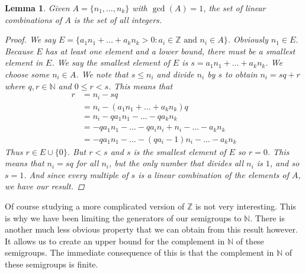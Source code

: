 \documentclass[11pt]{amsart}
\theoremstyle{plain}
\newtheorem{lemma}{Lemma}
\theoremstyle{definition}
\begin{document}
\begin{lemma}
  Given $A=\{n_1,\dots,n_k\}$ with $\gcd(A)=1$, the set of linear
  combinations of $A$ is the set of all integers.
  \begin{proof}
    We say $E=\{a_1n_1+\dots+a_kn_k>0:a_i\in \mathbb{Z}\text{ and }n_i\in A\}$.
    Obviously $n_1\in E$. Because $E$ has at least one element and a lower
    bound, there must be a smallest element in $E$. We say the smallest element
    of $E$ is $s=a_1n_1+\dots+a_kn_k$. We choose some $n_i\in A$. We note that
    $s\le n_i$ and divide $n_i$ by $s$ to obtain $n_i=sq+r$ where
    $q,r\in \mathbb{N}$ and $0\le r<s$. This means that
    \begin{align*}
      r&=n_i-sq\\
      &=n_i-(a_1n_1+\dots+a_kn_k)q\\
      &=n_i-qa_1n_1-\dots-qa_kn_k\\
      &=-qa_1n_1-\dots-qa_in_i+n_i-\dots-a_kn_k\\
      &=-qa_1n_1-\dots-(qa_i-1)n_i-\dots-a_kn_k
    \end{align*}
    Thus $r\in E\cup \{0\}$. But $r<s$ and $s$ is the smallest element of $E$ so
    $r=0$. This means that $n_i=sq$ for all $n_i$, but the only number that
    divides all $n_i$ is $1$, and so $s=1$. And since every multiple of $s$ is
    a linear combination of the elements of $A$, we have our result.
  \end{proof}
\end{lemma}
Of course studying a more complicated version of $\mathbb{Z}$ is not very
interesting. This is why we have been limiting the generators of our semigroups
to $\mathbb{N}$. There is another much less obvious property that we can obtain
from this result however. It allows us to create an upper bound for the
complement in $\mathbb{N}$ of these semigroups. The immediate consequence of this
is that the complement in $\mathbb{N}$ of these semigroups is finite.
\end{document}
